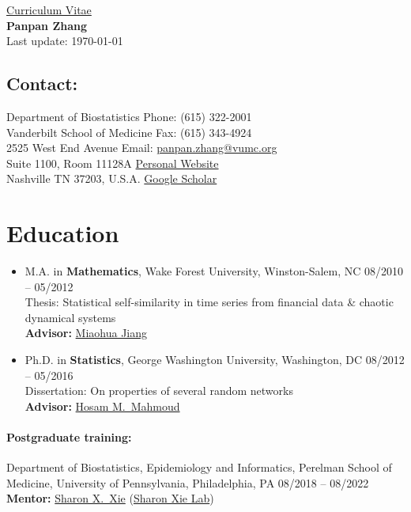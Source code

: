 \documentclass[12pt]{article}
\begin{document}
	
	\begin{center}
		\huge{
			\underline{Curriculum Vitae}
		}
		\vspace{10pt} \\
		\Large{
			\rmfamily
			\textbf{Panpan Zhang}
		}
		\vspace{10pt} \\
		\small{Last update: \today}	
	\end{center}
	\vspace{10pt}
	
	\subsection*{Contact:}
	Department of Biostatistics \hfill Phone: (615) 322-2001 \\
	Vanderbilt School of Medicine \hfill Fax: (615) 343-4924 \\
	2525 West End Avenue \hfill Email: \href{mailto:panpan.zhang@vumc.org}
	{panpan.zhang@vumc.org} \\
	Suite 1100, Room 11128A \hfill \href{https://panpan-zhang.com/}{Personal Website} \\
	Nashville TN 37203, U.S.A. \hfill \href{https://scholar.google.com/citations?user=XMgB5OYAAAAJ&hl=en}{Google Scholar}
	
	\section*{Education}
	\begin{itemize}
		\item M.A. in \textbf{Mathematics}, Wake Forest University, Winston-Salem, NC \hfill 08/2010 -- 05/2012 \\
		Thesis: Statistical self-similarity in time series from financial data \& chaotic dynamical systems \\
		{\bf Advisor:} \href{https://math.wfu.edu/jiang}{Miaohua Jiang}
		\item Ph.D. in \textbf{Statistics}, George Washington University, Washington, DC \hfill 08/2012 -- 05/2016 \\
		Dissertation: On properties of several random networks \\
		{\bf Advisor:} 
		\href{https://statistics.columbian.gwu.edu/hosam-m-mahmoud}
		{Hosam M.\ Mahmoud}
	\end{itemize}
	\paragraph{Postgraduate training:} Department of 
	Biostatistics, Epidemiology and Informatics, Perelman School of Medicine, University of Pennsylvania, Philadelphia, PA \hfill 08/2018 -- 08/2022 \\
	{\bf Mentor:} 
	\href{https://www.med.upenn.edu/apps/faculty/index.php/g275/
		p9964}{Sharon X.\ Xie} 
	(\href{https://sites.google.com/view/sharonxielab/
		home?authuser=0}{Sharon Xie Lab})
	
\end{document}
